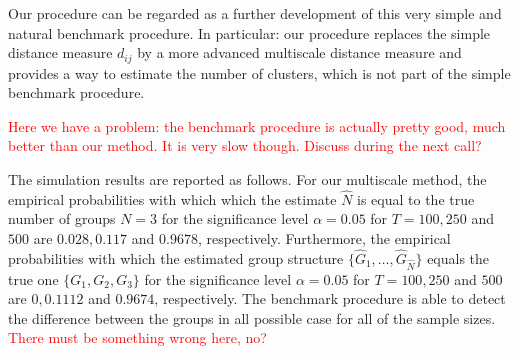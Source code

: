 \documentclass[a4paper,12pt]{article}
\begin{document}
Our procedure can be regarded as a further development of this very simple and natural benchmark procedure. In particular: our procedure replaces the simple distance measure $d_{ij}$ by a more advanced multiscale distance measure and provides a way to estimate the number of clusters, which is not part of the simple benchmark procedure.

%
%
%
%
%

\textcolor{red}{Here we have a problem: the benchmark procedure is actually pretty good, much better than our method. It is very slow though. Discuss during the next call?}

The simulation results are reported as follows. For our multiscale method, the empirical probabilities with which which the estimate $\widehat{N}$ is equal to the true number of groups $N = 3$ for the significance level $\alpha=0.05$ for $T=100, 250$ and $500$ are $0.028, 0.117$ and $0.9678$, respectively. Furthermore, the  empirical probabilities with which the estimated group structure $\{ \widehat{G}_1,\ldots,\widehat{G}_{\widehat{N}}\}$ equals the true one $\{G_1,G_2,G_3\}$ for the significance level $\alpha=0.05$ for $T=100, 250$ and $500$ are $0, 0.1112$ and $0.9674$, respectively. The benchmark procedure is able to detect the difference between the groups in all possible case for all of the sample sizes. \textcolor{red}{There must be something wrong here, no?}
\end{document}

